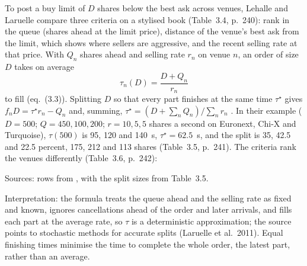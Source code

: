 \begin{qfmethod}\label{meth:passive-order-split}
 To post a buy limit of $D$ shares below the best ask across venues, Lehalle and Laruelle compare three criteria on a stylised book (Table~3.4, p.~240): rank in the queue (shares ahead at the limit price), distance of the venue's best ask from the limit, which shows where sellers are aggressive, and the recent selling rate at that price. With $Q_n$ shares ahead and selling rate $r_n$ on venue $n$, an order of size $D$ takes on average
\[ \tau_n(D)=\frac{D+Q_n}{r_n} \]
to fill (eq.~(3.3)). Splitting $D$ so that every part finishes at the same time $\tau^\star$ gives $f_nD=\tau^\star r_n-Q_n$ and, summing, $\tau^\star=(D+\sum_nQ_n)/\sum_nr_n$ \citep[sec.~3.4.2, pp.~239--241, n.~16]{alpha-laruelle}. In their example ($D=500$; $Q=450, 100, 200$; $r=10, 5, 5$ shares a second on Euronext, Chi-X and Turquoise), $\tau(500)$ is 95, 120 and 140~s, $\tau^\star=62.5$~s, and the split is 35, 42.5 and 22.5 percent, 175, 212 and 113 shares (Table~3.5, p.~241). The criteria rank the venues differently (Table~3.6, p.~242):

\smallskip
{}
\smallskip

\noindent Sources: rows from \citep[sec.~3.4.2, Table~3.6, p.~242]{alpha-laruelle}, with the split sizes from Table~3.5.

 Interpretation: the formula treats the queue ahead and the selling rate as fixed and known, ignores cancellations ahead of the order and later arrivals, and fills each part at the average rate, so $\tau$ is a deterministic approximation; the source points to stochastic methods for accurate splits (Laruelle et al.\ 2011). Equal finishing times minimise the time to complete the whole order, the latest part, rather than an average.


\end{qfmethod}
